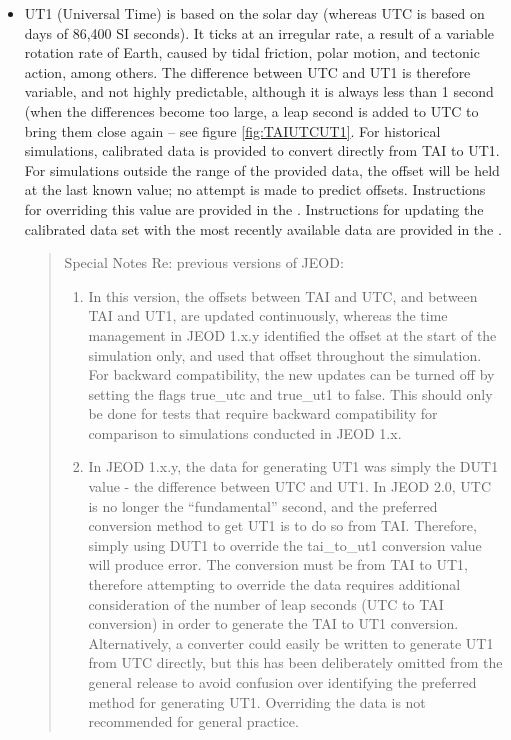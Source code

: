 \begin{itemize}
\item UT1 (Universal Time) is based on the solar day (whereas UTC is
based on days of 86,400 SI seconds).  It ticks at an irregular
rate, a result of a variable rotation rate of Earth, caused by
tidal friction, polar motion, and tectonic action, among others.  The
difference between UTC and UT1 is therefore variable, and not highly
predictable, although it is always less than 1 second (when the
differences become too large, a leap second is added to UTC to bring
them close again -- see figure \ref{fig:TAIUTCUT1}.  For historical simulations, calibrated data is
provided to convert directly from TAI to UT1.  For simulations outside
the range of the provided data, the offset will be held at the last
known value; no attempt is made to predict offsets.  Instructions for
overriding this value are provided in the .  Instructions for updating
the calibrated data set with the most recently available data are provided in the .


\begin{quotation}
Special Notes Re: previous versions of JEOD:
\begin{enumerate}
\item In this version, the offsets between TAI and UTC, and between
TAI and UT1, are updated continuously, whereas the time management in JEOD 1.x.y identified the offset
at the start of the simulation only, and used that offset throughout
the simulation.  For backward compatibility, the new updates can be
turned off by setting the flags true\_utc and true\_ut1 to
false. This should only
be done for tests that require backward compatibility for comparison to
simulations conducted in JEOD 1.x.
\item In JEOD 1.x.y, the data for generating UT1 was simply the DUT1 value - the difference between UTC and UT1.  In JEOD 2.0, UTC is no longer the ``fundamental'' second, and the preferred conversion method to get UT1 is to do so from TAI.  Therefore, simply using DUT1 to override the tai\_to\_ut1 conversion value will produce error.  The conversion must be from TAI to UT1, therefore attempting to override the data requires additional consideration of the number of leap seconds (UTC to TAI conversion) in order to generate the TAI to UT1 conversion.  Alternatively, a converter could easily be written to generate UT1 from UTC directly, but this has been deliberately omitted from the general release to avoid confusion over identifying the preferred method for generating UT1.  Overriding the data is not recommended for general practice.
\end{enumerate}
\end{quotation}




\end{itemize}
